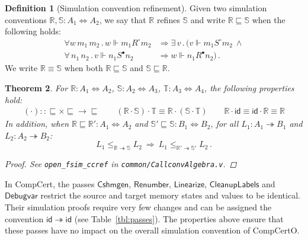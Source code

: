 \documentclass[draft,11pt]{report}
\newtheorem{theorem}{Theorem}[chapter]
\theoremstyle{definition}
\newtheorem{definition}[theorem]{Definition}
\newcommand{\kw}[1]{\ensuremath{ \mathsf{#1} }}
\newcommand{\que}{\circ}         %
\newcommand{\ans}{\bullet}       %
\newcommand{\scref}{\sqsubseteq} %
\begin{document}
\begin{definition}[Simulation convention refinement] %
Given two simulation conventions
$\mathbb{R}, \mathbb{S} : A_1 \Leftrightarrow A_2$,
we say that
$\mathbb{R}$ refines $\mathbb{S}$ and write
$\mathbb{R} \scref \mathbb{S}$
when the following holds:
\begin{align*}
  \forall w \, m_1 \, m_2 \,.\,
  w \Vdash m_1 \mathrel{R^\que} m_2 &\Rightarrow
  \exists \, v \,.\, (
  v \Vdash m_1 \mathrel{S^\que} m_2
  \: \wedge \\
  \forall \, n_1 \, n_2 \,.\,
  v \Vdash n_1 \mathrel{S^\ans} n_2 &\Rightarrow
  w \Vdash n_1 \mathrel{R^\ans} n_2) \,.
\end{align*}
We write $\mathbb{R} \equiv \mathbb{S}$ when both
$\mathbb{R} \scref \mathbb{S}$ and
$\mathbb{S} \scref \mathbb{R}$.
\end{definition}

\begin{theorem} %
For
$\mathbb{R} : A_1 \Leftrightarrow A_2$,
$\mathbb{S} : A_2 \Leftrightarrow A_3$,
$\mathbb{T} : A_3 \Leftrightarrow A_4$,
the following properties hold:
\begin{gather*}
  ({\cdot}) :: {{\scref} \times {\scref} \rightarrow {\scref}}
  \qquad
  (\mathbb{R} \cdot \mathbb{S}) \cdot \mathbb{T} \equiv
    \mathbb{R} \cdot (\mathbb{S} \cdot \mathbb{T})
  \qquad
  \mathbb{R} \cdot \kw{id} \equiv
  \kw{id} \cdot \mathbb{R} \equiv
  \mathbb{R}
\end{gather*}
In addition, when
$\mathbb{R} \scref \mathbb{R}' : A_1 \Leftrightarrow A_2$ and
$\mathbb{S}' \scref \mathbb{S} : B_1 \Leftrightarrow B_2$,
for all
$L_1 : A_1 \twoheadrightarrow B_1$ and $L_2 : A_2 \twoheadrightarrow B_2$:
\[
      L_1 \le_{\mathbb{R} \twoheadrightarrow \mathbb{S}} L_2
      \: \Rightarrow \:
      L_1 \le_{\mathbb{R}' \twoheadrightarrow \mathbb{S}'} L_2 \,.
\]
\begin{proof}
See \texttt{open\_fsim\_ccref} in \texttt{common/CallconvAlgebra.v}.
\end{proof}
\end{theorem}

In CompCert,
the passes \kw{Cshmgen}, \kw{Renumber}, \kw{Linearize},
\kw{CleanupLabels} and \kw{Debugvar}
restrict the source and target
memory states and values to be identical.
Their simulation proofs require very few changes
and can be assigned the convention $\kw{id} \twoheadrightarrow \kw{id}$
(see Table~\ref{tbl:passes}).
The properties above ensure that these passes
have no impact on the overall simulation convention
of CompCertO.
\end{document}

